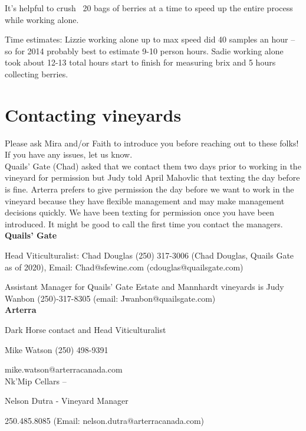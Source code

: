 \documentclass[11pt,letter]{article}
\begin{document}
It’s helpful to crush ~20 bags of berries at a time to speed up the entire process while working alone. 

Time estimates: Lizzie working alone up to max speed did 40 samples an hour -- so for 2014 probably best to estimate 9-10 person hours. Sadie working alone took about 12-13 total hours start to finish for measuring brix and 5 hours collecting berries. 

\section{Contacting vineyards}
Please ask Mira and/or Faith to introduce you before reaching out to these folks! If you have any issues, let us know.\\

Quails' Gate (Chad) asked that we contact them two days prior to working in the vineyard for permission but Judy told April Mahovlic that texting the day before is fine. Arterra prefers to give permission the day before we want to work in the vineyard because they have flexible management and may make management decisions quickly. We have been texting for permission once you have been introduced. It might be good to call the first time you contact the managers. \\


{\bf Quails' Gate}

Head Viticulturalist: Chad Douglas (250) 317-3006 (Chad Douglas, Quails Gate as of 2020), Email: Chad@sfewine.com (cdouglas@quailsgate.com)

Assistant Manager for Quails' Gate Estate and Mannhardt vineyards is Judy Wanbon (250)-317-8305 (email: Jwanbon@quailsgate.com) \\

{\bf Arterra}

Dark Horse contact and Head Viticulturalist %

Mike Watson (250) 498-9391

mike.watson@arterracanada.com\\

Nk'Mip Cellars --

Nelson Dutra - Vineyard Manager

250.485.8085 (Email: nelson.dutra@arterracanada.com) \\
\end{document}
